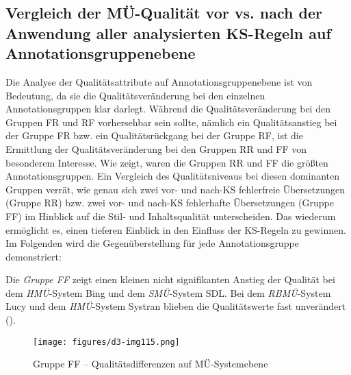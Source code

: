 \subsection{Vergleich der MÜ-Qualität vor vs. nach der Anwendung aller analysierten KS-Regeln auf Annotationsgruppenebene}
\label{sec:5.4.6}

Die Analyse der Qualitätsattribute auf Annotationsgruppenebene ist von Bedeutung, da sie die Qualitätsveränderung bei den einzelnen Annotationsgruppen klar darlegt. Während die Qualitätsveränderung bei den Gruppen FR und RF vorhersehbar sein sollte, nämlich ein Qualitätsanstieg bei der Gruppe FR bzw. ein Qualitätsrückgang bei der Gruppe RF, ist die Ermittlung der Qualitätsveränderung bei den Gruppen RR und FF von besonderem Interesse. Wie  zeigt, waren die Gruppen RR und FF die größten Annotationsgruppen. Ein Vergleich des Qualitätsniveaus bei diesen dominanten Gruppen verrät, wie genau sich zwei vor- und nach-KS fehlerfreie Übersetzungen (Gruppe RR) bzw. zwei vor- und nach-KS fehlerhafte Übersetzungen (Gruppe FF) im Hinblick auf die Stil- und Inhaltsqualität unterscheiden. Das wiederum ermöglicht es, einen tieferen Einblick in den Einfluss der KS-Regeln zu gewinnen. Im Folgenden wird die Gegenüberstellung für jede Annotationsgruppe demonstriert:

Die \textit{Gruppe FF} zeigt einen kleinen nicht signifikanten Anstieg der Qualität bei dem \textit{HMÜ}{}-System Bing und dem \textit{SMÜ}{}-System SDL. Bei dem \textit{RBMÜ}{}-System Lucy und dem \textit{HMÜ}{}-System Systran blieben die Qualitätswerte fast unverändert ().


\begin{figure}

\texttt{[image: figures/d3-img115.png]}




\caption{\label{fig:05:143}Gruppe FF -- Qualitätsdifferenzen auf MÜ-Systemebene   }
\end{figure}

